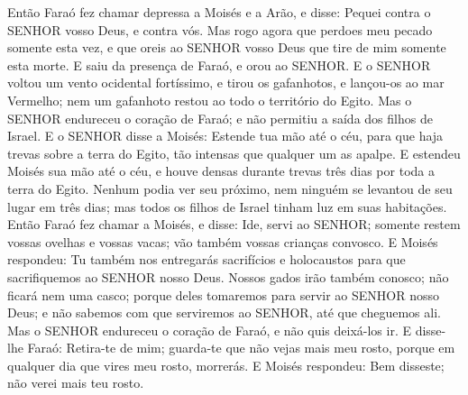 {Então Faraó fez chamar depressa a Moisés e a Arão, e disse: Pequei contra o SENHOR vosso Deus, e contra vós.
Mas rogo agora que perdoes meu pecado somente esta vez, e que oreis ao SENHOR vosso Deus que tire de mim somente esta morte.
E saiu da presença de Faraó, e orou ao SENHOR.
E o SENHOR voltou um vento ocidental fortíssimo, e tirou os gafanhotos, e lançou-os ao mar Vermelho; nem um gafanhoto restou ao todo o território do Egito.
Mas o SENHOR endureceu o coração de Faraó; e não permitiu a saída dos filhos de Israel.
E o SENHOR disse a Moisés: Estende tua mão até o céu, para que haja trevas sobre a terra do Egito, tão intensas que qualquer um as apalpe.
E estendeu Moisés sua mão até o céu, e houve densas durante trevas três dias por toda a terra do Egito.
Nenhum podia ver seu próximo, nem ninguém se levantou de seu lugar em três dias; mas todos os filhos de Israel tinham luz em suas habitações.
Então Faraó fez chamar a Moisés, e disse: Ide, servi ao SENHOR; somente restem vossas ovelhas e vossas vacas; vão também vossas crianças convosco.
E Moisés respondeu: Tu também nos entregarás sacrifícios e holocaustos para que sacrifiquemos ao SENHOR nosso Deus.
Nossos gados irão também conosco; não ficará nem uma casco; porque deles tomaremos para servir ao SENHOR nosso Deus; e não sabemos com que serviremos ao SENHOR, até que cheguemos ali.
Mas o SENHOR endureceu o coração de Faraó, e não quis deixá-los ir.
E disse-lhe Faraó: Retira-te de mim; guarda-te que não vejas mais meu rosto, porque em qualquer dia que vires meu rosto, morrerás.
E Moisés respondeu: Bem disseste; não verei mais teu rosto.

\par }
